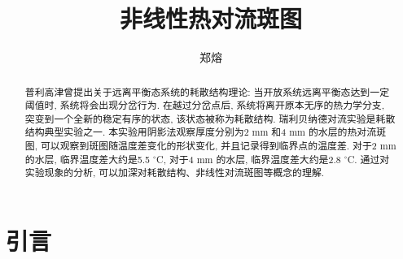\documentclass[font=default]{mpltx}
\makeatletter
\newcommand{\note}[1]{{\color{gray}#1}}
\newcommand*\file[1]{\textbf{\texttt{#1}}}
\newcommand\releasedate{%
    \href{https://github.com/CastleStar14654/PKUMpLtX/releases/tag/\mpltx@fileversion}%
        {\mpltx@filedate, \mpltx@fileversion}}
\makeatother
\begin{document}
\title{非线性热对流斑图} %
\author{郑熔} %
\date{}
\begin{abstract}
  普利高津曾提出关于远离平衡态系统的耗散结构理论: 当开放系统远离平衡态达到一定阈值时, 系统将会出现分岔行为. 在越过分岔点后, 系统将离开原本无序的热力学分支, 突变到一个全新的稳定有序的状态,
  该状态被称为耗散结构.
  瑞利贝纳德对流实验是耗散结构典型实验之一.
  本实验用阴影法观察厚度分别为2 mm 和4 mm 的水层的热对流斑图, 可以观察到斑图随温度差变化的形状变化, 并且记录得到临界点的温度差. 对于2 mm 的水层, 
  临界温度差大约是5.5 $^\circ$C, 对于4 mm 的水层, 临界温度差大约是2.8 $^\circ$C. 通过对实验现象的分析, 可以加深对耗散结构、非线性对流斑图等概念的理解.
 
\end{abstract}

\maketitle

\section{引言}
\end{document}
